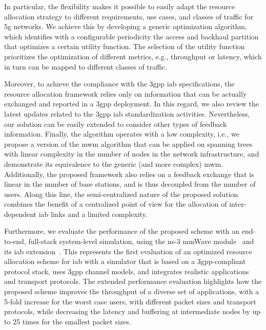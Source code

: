 In particular, the flexibility makes it possible to easily adapt the resource allocation strategy to different requirements, use cases, and classes of traffic for \gls{5g} networks. We achieve this by developing a generic optimization algorithm, which identifies with a configurable periodicity the access and backhaul partition that optimizes a certain utility function. The selection of the utility function prioritizes the optimization of different metrics, e.g., throughput or latency, which in turn can be mapped to different classes of traffic.

Moreover, to achieve the compliance with the \gls{3gpp} \gls{iab} specifications, the resource allocation framework relies only on information that can be actually exchanged and reported in a \gls{3gpp} deployment. In this regard, we also review the latest updates related to the \gls{3gpp} \gls{iab} standardization activities. Nevertheless, our solution can be easily extended to consider other types of feedback information.
Finally, the algorithm operates with a low complexity, i.e., we propose a version of the \gls{mwm} algorithm that can be applied on spanning trees with linear complexity in the number of nodes in the network infrastructure, and demonstrate its equivalence to the generic (and more complex) \gls{mwm}. Additionally, the proposed framework also relies on a feedback exchange that is linear in the number of base stations, and is thus decoupled from the number of users. Along this line, the semi-centralized nature of the proposed solution combines the benefit of a centralized point of view for the allocation of inter-dependent \gls{iab} links and a limited complexity.

Furthermore, we evaluate the performance of the proposed scheme with an end-to-end, full-stack system-level simulation, using the ns-3 mmWave module~\cite{mezzavilla2018end} and its \gls{iab} extension~\cite{polese2018end}. This represents the first evaluation of an optimized resource allocation scheme for \gls{iab} with a simulator that is based on a \gls{3gpp}-compliant protocol stack, uses \gls{3gpp} channel models, and integrates realistic applications and transport protocols. The extended performance evaluation highlights how the proposed scheme improves the throughput of a diverse set of applications, with a 5-fold increase for the worst case users, with different packet sizes and transport protocols, while decreasing the latency and buffering at intermediate nodes by up to 25 times for the smallest packet sizes.

